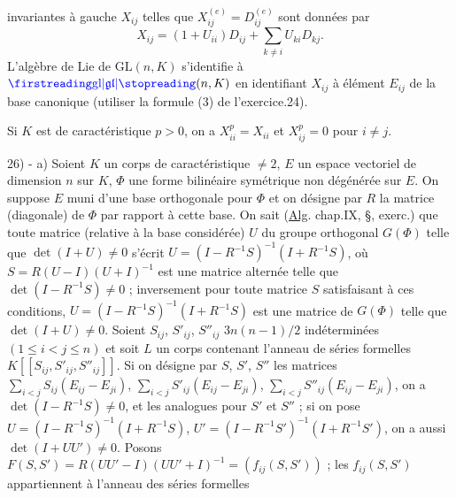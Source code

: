 invariantes à gauche $X_{ij}$ telles que $X_{ij}^{(e)}=D_{ij}^{(e)}$ sont données par
\[
X_{ij}=(1+U_{ii})D_{ij}+\sum_{k\ne i}U_{ki}D_{kj}.
\]
L'algèbre de Lie de $\mathrm{GL}(n,K)$ s'identifie à $\unsure{\mathrm{gl}|\mathfrak{gl}}(n,K)$ en identifiant $X_{ij}$ à élément $E_{ij}$ de la base canonique (utiliser la formule (3) de l'exercice.24).

Si $K$ est de caractéristique $p>0$, on a $X_{ii}^p=X_{ii}$ et $X_{ij}^p=0$ pour $i\ne j$.

\margin{\P}
26) - a) Soient $K$ un corps de caractéristique $\ne2$, $E$ un espace vectoriel de dimension $n$ sur $K$, $\Phi$ une forme bilinéaire symétrique non dégénérée sur $E$. On suppose $E$ muni d'une base orthogonale pour $\Phi$ et on désigne par $R$ la matrice (diagonale) de $\Phi$ par rapport à cette base. On sait (\uline{Alg}. chap.IX, \S\quad, exerc.\quad) que toute matrice (relative à la base considérée) $U$ du groupe orthogonal $G(\Phi)$ telle que $\det(I+U)\ne0$ s'écrit $U=(I-R^{-1}S)^{-1}(I+R^{-1}S)$, où $S=R(U-I)(U+I)^{-1}$ est une matrice alternée telle que $\det(I-R^{-1}S)\ne0$ ; inversement pour toute matrice $S$ satisfaisant à ces conditions, $U=(I-R^{-1}S)^{-1}(I+R^{-1}S)$ est une matrice de $G(\Phi)$ telle que $\det(I+U)\ne0$. Soient $S_{ij}$, $S'_{ij}$, $S''_{ij}$ $3n(n-1)/2$ indéterminées $(1\leq i<j\leq n)$ et soit $L$ un corps contenant l'anneau de séries formelles $K[[S_{ij},S'_{ij},S''_{ij}]]$. Si on désigne par $S$, $S'$, $S''$ les matrices $\sum_{i<j}S_{ij}(E_{ij}-E_{ji})$, $\sum_{i<j}S'_{ij}(E_{ij}-E_{ji})$, $\sum_{i<j}S''_{ij}(E_{ij}-E_{ji})$, on a $\det(I-R^{-1}S)\ne0$, et les analogues pour $S'$ et $S''$ ; si on pose $U=(I-R^{-1}S)^{-1}(I+R^{-1}S)$, $U'=(I-R^{-1}S')^{-1}(I+R^{-1}S')$, on a aussi $\det(I+UU')\ne0$. Posons $F(S,S')=R(UU'-I)(UU'+I)^{-1}=(f_{ij}(S,S'))$ ; les $f_{ij}(S,S')$ appartiennent à l'anneau des séries formelles
